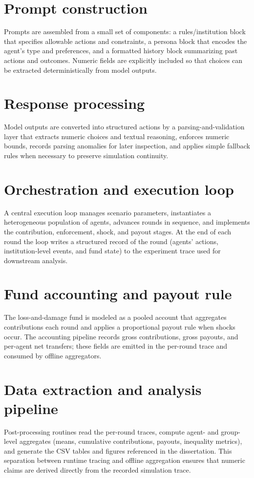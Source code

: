 \documentclass[12pt,letterpaper]{report}
\begin{document}
\section{Prompt construction}
Prompts are assembled from a small set of components: a rules/institution block that specifies allowable actions and constraints, a persona block that encodes the agent's type and preferences, and a formatted history block summarizing past actions and outcomes. Numeric fields are explicitly included so that choices can be extracted deterministically from model outputs.

\section{Response processing}
Model outputs are converted into structured actions by a parsing-and-validation layer that extracts numeric choices and textual reasoning, enforces numeric bounds, records parsing anomalies for later inspection, and applies simple fallback rules when necessary to preserve simulation continuity.

\section{Orchestration and execution loop}
A central execution loop manages scenario parameters, instantiates a heterogeneous population of agents, advances rounds in sequence, and implements the contribution, enforcement, shock, and payout stages. At the end of each round the loop writes a structured record of the round (agents' actions, institution-level events, and fund state) to the experiment trace used for downstream analysis.

\section{Fund accounting and payout rule}
The loss-and-damage fund is modeled as a pooled account that aggregates contributions each round and applies a proportional payout rule when shocks occur. The accounting pipeline records gross contributions, gross payouts, and per-agent net transfers; these fields are emitted in the per-round trace and consumed by offline aggregators.

\section{Data extraction and analysis pipeline}
Post-processing routines read the per-round traces, compute agent- and group-level aggregates (means, cumulative contributions, payouts, inequality metrics), and generate the CSV tables and figures referenced in the dissertation. This separation between runtime tracing and offline aggregation ensures that numeric claims are derived directly from the recorded simulation trace.
\end{document}
